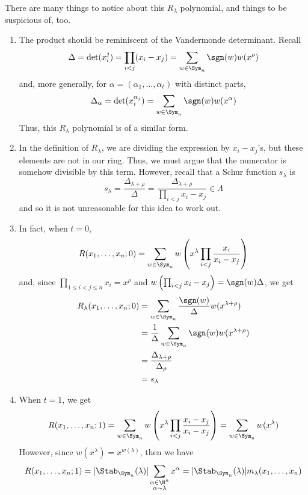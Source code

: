\documentclass[11pt,leqno,oneside]{amsart}
\numberwithin{thm}{section}
\newcommand{\Vdet}{\Delta}
\newcommand{\rowshift}{\rho}
\newcommand{\sym}{\Lambda}
\begin{document}
\begin{rmk}
  There are many things to notice about this \(R_\lambda\) polynomial,
  and things to be suspicious of, too.
  \begin{enumerate}
  \item The product should be reminiscent of the Vandermonde
    determinant. Recall \[
      \Vdet = \det(x_i^j) = \prod_{i < j} (x_i - x_j) = \sum_{w \in
        \Sym_n} \sgn(w) w(x^\rowshift)
    \]
    and, more generally, for \(\alpha = (\alpha_1, \ldots,
    \alpha_\ell)\) with distinct parts, \[
      \Vdet_{\alpha} = \det(x_i^{\alpha_j}) = \sum_{w \in \Sym_n}
      \sgn(w)w(x^{\alpha}) 
    \]
    Thus, this \(R_\lambda\)  polynomial is of a similar form.
  \item In the definition of \(R_\lambda\), we are dividing the
    expression by \(x_i-x_j\)'s, but these elements are not in our
    ring. Thus, we must argue that the numerator is somehow divisible
    by this term. However, recall that a Schur function \(s_\lambda\) is \[
      s_\lambda = \frac{\Vdet_{\lambda+\rowshift}}{\Vdet} =
      \frac{\Vdet_{\lambda+\rowshift}}{\prod_{i<j} x_i - x_j} \in \sym
    \]
    and so it is not unreasonable for this idea to work out.
  \item In fact, when \(t=0\), \[
      R(x_1, \ldots, x_n;0) = \sum_{w \in \Sym_n} w\left( x^\lambda
        \prod_{i < j} \frac{x_i}{x_i-x_j} \right)
    \]
    and, since \(\prod_{1 \leq i < j \leq n} x_i = x^\rowshift\) and
    \(w\left( \prod_{i < j} x_i - x_j \right) = \sgn(w)\Vdet\), we get
    \begin{align*}
      R_\lambda(x_1, \ldots, x_n;0)
      & = \sum_{w \in \Sym_n} \frac{\sgn(w)}{\Vdet}
        w(x^{\lambda+\rowshift}) \\
      & = \frac{1}{\Vdet} \sum_{w \in \Sym_n} \sgn(w)
        w(x^{\lambda+\rowshift}) \\
      & = \frac{\Vdet_{\lambda+\rowshift}}{\Vdet_{\rowshift}} \\
      & = s_\lambda
    \end{align*}
  \item When \(t=1\), we get \[
      R(x_1, \ldots, x_n;1) = \sum_{w \in \Sym_n} w \left( x^\lambda
        \prod_{i < j} \frac{x_i-x_j}{x_i-x_j} \right) = \sum_{w \in
        \Sym_n} w(x^\lambda)
    \]
    However, since \(w(x^\lambda) = x^{w(\lambda)}\), then we have \[
      R(x_1, \ldots, x_n;1)  = |\Stab_{\Sym_n}(\lambda)|
      \sum_{\substack{\alpha \in \N^n \\ \alpha \sim \lambda}}  x^\alpha =
    |\Stab_{\Sym_n}(\lambda)| m_{\lambda}(x_1, \ldots, x_n)
    \]
  \end{enumerate}
\end{rmk}
\end{document}
